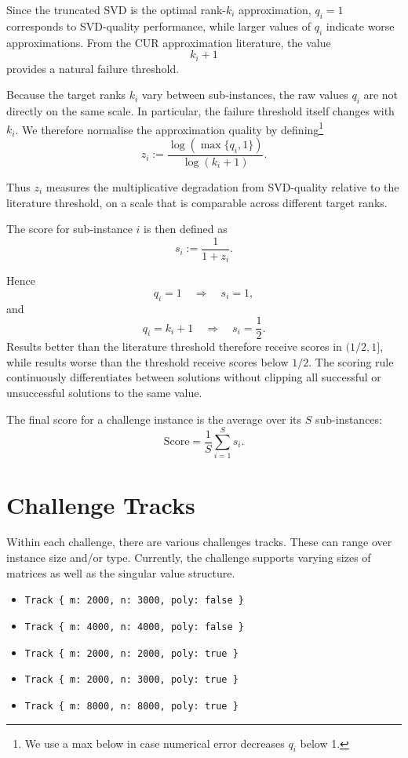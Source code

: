 \documentclass[12pt, legalpaper]{article}
\begin{document}
Since the truncated SVD is the optimal rank-$k_i$ approximation, $q_i=1$
corresponds to SVD-quality performance, while larger values of $q_i$ indicate
worse approximations. From the CUR approximation literature, the value
\[
k_i+1
\]
provides a natural failure threshold.

Because the target ranks $k_i$ vary between sub-instances, the raw values
$q_i$ are not directly on the same scale. In particular, the failure threshold
itself changes with $k_i$. We therefore normalise the approximation quality by
defining\footnote{We use a max below in case numerical error decreases $q_i$ below 1.}
\begin{equation}\label{eq normalized_quality}
z_i
:=
\frac{\log(\max\{q_i,1\})}
     {\log(k_i+1)}.
\end{equation}

Thus $z_i$ measures the multiplicative degradation from SVD-quality relative
to the literature threshold, on a scale that is comparable across different
target ranks.

The score for sub-instance $i$ is then defined as
\begin{equation}\label{eq scoring}
s_i
:=
\frac{1}{1+z_i}.
\end{equation}

Hence
\[
q_i=1
\quad\Longrightarrow\quad
s_i=1,
\]
and
\[
q_i=k_i+1
\quad\Longrightarrow\quad
s_i=\frac{1}{2}.
\]
Results better than the literature threshold therefore receive scores in
$(1/2,1]$, while results worse than the threshold receive scores below $1/2$.
The scoring rule continuously differentiates between solutions without
clipping all successful or unsuccessful solutions to the same value.

The final score for a challenge instance is the average over its $S$
sub-instances:
\[
\mathrm{Score}
=
\frac{1}{S}
\sum_{i=1}^{S}s_i.
\]



\section{Challenge Tracks}\label{sec:diffparams}
Within each challenge, there are various challenges tracks. These can range over instance size and/or type. Currently, the challenge supports varying sizes of matrices as well as the singular value structure.
\begin{itemize}

    \item \texttt{Track \{ m: 2000, n: 3000, poly: false \}}
    \item \texttt{Track \{ m: 4000, n: 4000, poly: false \}}
    \item \texttt{Track \{ m: 2000, n: 2000, poly: true \}}
    \item \texttt{Track \{ m: 2000, n: 3000, poly: true \}}
    \item \texttt{Track \{ m: 8000, n: 8000, poly: true \}}
\end{itemize}
\end{document}
